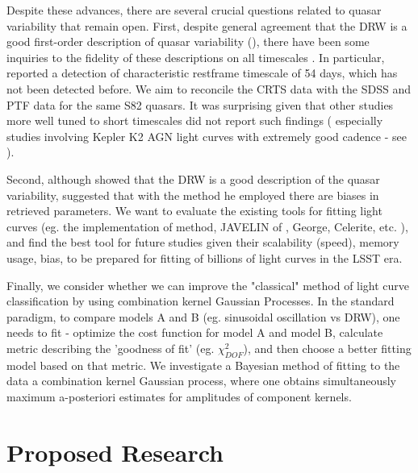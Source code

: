 \documentclass[modern]{aastex62}
\begin{document}
Despite these advances, there are several crucial questions related to quasar variability that remain open. First, despite general agreement that the DRW is a good first-order description of quasar variability (\cite{zu2011,kozlowski2010, }), there have been some inquiries to the fidelity of these descriptions on all timescales \cite{zu2013, kasliwal2017, sartori2018}. In particular, \cite{graham2014} reported  a detection of characteristic restframe timescale of 54 days, which has not been detected before.  We  aim to reconcile the CRTS data with the SDSS and PTF data for the same S82 quasars. It was surprising given that other studies more well tuned to short timescales did not report such findings ( especially studies involving Kepler K2  AGN light curves with extremely good cadence - see \cite{kasliwal2015a, aranzana2018, smith2018,}).

Second, although \cite{kelly2011} showed that the DRW is a good description of the quasar variability, \cite{kozlowski2017a} suggested that with the method he employed there are biases in retrieved parameters. We want to evaluate the existing tools for fitting light curves (eg. the implementation of \cite{rybicki1995} method, JAVELIN of \cite{zu2011}, George, Celerite, etc. ), and find the best tool for future studies given their scalability (speed), memory usage, bias, to be prepared for fitting of billions of light curves in the LSST era. 

Finally, we consider whether we can improve the "classical" method of light curve classification by using combination kernel Gaussian Processes. In the standard paradigm,  to compare models A and B (eg. sinusoidal oscillation vs DRW), one needs to fit  - optimize the cost function for model A and model B,  calculate metric describing the 'goodness of fit' (eg. $\chi^{2}_{DOF}$), and then choose a better fitting model based on that metric. We investigate a Bayesian method of fitting to the data a combination kernel Gaussian process, where one obtains simultaneously maximum a-posteriori estimates for  amplitudes of component kernels. 


\section{Proposed Research}
\end{document}
